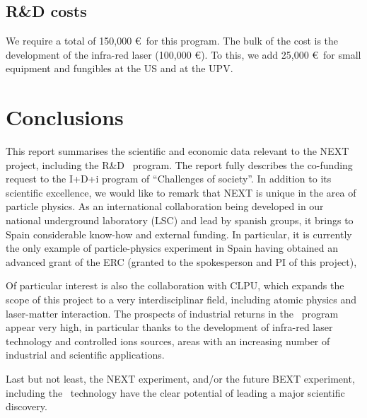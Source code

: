 \documentclass[a4paper,11pt,oneside]{article}
\begin{document}
\subsection{R\&D costs}
We require a total of 150,000 \euro\ for this program. The bulk of the cost is the development of the infra-red laser (100,000 \euro). To this, we add 25,000 \euro\ for small equipment and fungibles at the US and at the UPV. 

\section{Conclusions}
\label{sec.conclu}

This report summarises the scientific and economic data relevant to the NEXT project, including the R\&D \BATA\ program. The report fully describes the co-funding request to the I+D+i program of ``Challenges of society''. In addition to its scientific excellence, we would like to remark that NEXT is unique in the area of particle physics. As an international collaboration being developed in our national underground laboratory (LSC) and lead by spanish groups, it brings to Spain considerable know-how and external funding. In particular, it is currently the only example of particle-physics experiment in Spain having obtained an advanced grant of the ERC (granted to the spokesperson and PI of this project), 

Of particular interest is also the collaboration with CLPU, which expands the scope of this project to a very interdisciplinar field, including atomic physics and laser-matter interaction. The prospects of industrial returns in the \BATA\ program appear very high, in particular thanks to the development of infra-red laser technology and controlled ions sources, areas with an increasing number of industrial and scientific applications. 

Last but not least, the NEXT experiment, and/or the future BEXT experiment, including the \BATA\ technology have the clear potential of leading a major scientific discovery.
\end{document}
